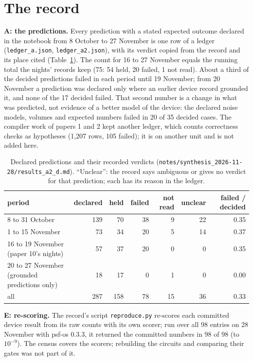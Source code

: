 \documentclass[10pt,a4paper]{article}
\begin{document}
\section{The record}\label{sec:record}
\textbf{A: the predictions.} Every prediction with a stated expected outcome declared in the notebook from 8 October to
27 November is one row of a ledger (\texttt{ledger\_a.json}, \texttt{ledger\_a2.json}), with its verdict copied from the
record and its place cited (Table~\ref{tab:ledger}). The count for 16 to 27 November equals the running total the
nights' records keep (75: 54 held, 20 failed, 1 not read). About a third of the decided predictions failed in each
period until 19 November; from 20 November a prediction was declared only where an earlier device record grounded it,
and none of the 17 decided failed. That second number is a change in what was predicted, not evidence of a better model
of the device: the declared noise models, volumes and expected numbers failed in 20 of 35 decided cases. The compiler
work of papers 1 and 2 kept another ledger, which counts correctness checks as hypotheses (1,207 rows, 105 failed); it is
on another unit and is not added here.

\begin{table}[H]\centering\footnotesize
\begin{tabular}{lrrrrrr}
\toprule
period & declared & held & failed & not read & unclear & failed / decided \\
\midrule
8 to 31 October & 139 & 70 & 38 & 9 & 22 & 0.35 \\
1 to 15 November & 73 & 34 & 20 & 5 & 14 & 0.37 \\
16 to 19 November (paper 10's nights) & 57 & 37 & 20 & 0 & 0 & 0.35 \\
20 to 27 November (grounded predictions only) & 18 & 17 & 0 & 1 & 0 & 0.00 \\
\midrule
all & 287 & 158 & 78 & 15 & 36 & 0.33 \\
\bottomrule
\end{tabular}
\caption{Declared predictions and their recorded verdicts (\texttt{notes/synthesis\_2026-11-28/results\_a2\_d.md}).
``Unclear'': the record says ambiguous or gives no verdict for that prediction; each has its reason in the ledger.}\label{tab:ledger}
\end{table}

\textbf{E: re-scoring.} The record's script \texttt{reproduce.py} re-scores each committed device result from its raw
counts with its own scorer; run over all 98 entries on 28 November with psf-os 0.3.3, it returned the committed numbers
in 98 of 98 (to $10^{-9}$). The census covers the scorers; rebuilding the circuits and comparing their gates was not
part of it.
\end{document}
